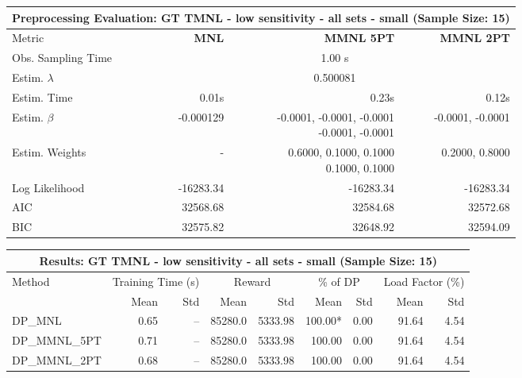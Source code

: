 
\begin{samepage}
\begin{center}
  \small
  \begin{tabular}{l|r|r|r}
    \toprule
    \multicolumn{4}{c}{\textbf{Preprocessing Evaluation: GT TMNL - low sensitivity - all sets - small (Sample Size: 15)}} \\
    \midrule
    Metric & \textbf{MNL} & \textbf{MMNL 5PT} & \textbf{MMNL 2PT} \\
    \midrule
    Obs. Sampling Time & \multicolumn{3}{c}{1.00 s} \\
    Estim. $\lambda$ & \multicolumn{3}{c}{0.500081} \\
    Estim. Time & 0.01s & 0.23s & 0.12s \\
    Estim. $\beta$ & -0.000129 & \makecell[tr]{-0.0001, -0.0001, -0.0001 \\ -0.0001, -0.0001} & -0.0001, -0.0001 \\
    Estim. Weights & - & \makecell[tr]{0.6000, 0.1000, 0.1000 \\ 0.1000, 0.1000} & 0.2000, 0.8000 \\
    Log Likelihood & -16283.34 & -16283.34 & -16283.34 \\
    AIC & 32568.68 & 32584.68 & 32572.68 \\
    BIC & 32575.82 & 32648.92 & 32594.09 \\
    \bottomrule
  \end{tabular}
\end{center}
\begin{center}
  \small
  \begin{tabular}{l|rr|rr|rr|rr}
    \toprule
    \multicolumn{9}{c}{\textbf{Results: GT TMNL - low sensitivity - all sets - small (Sample Size: 15)}} \\
    \midrule
    Method & \multicolumn{2}{c|}{Training Time (s)} & \multicolumn{2}{c|}{Reward} & \multicolumn{2}{c|}{\% of DP} & \multicolumn{2}{c}{Load Factor (\%)} \\
    & Mean & Std & Mean & Std & Mean & Std & Mean & Std \\
    \midrule
    DP\_MNL      &     0.65 &    -- &    85280.0 &    5333.98 & 100.00* &    0.00 &   91.64 &    4.54 \\
    DP\_MMNL\_5PT &     0.71 &    -- &    85280.0 &    5333.98 &  100.00 &    0.00 &   91.64 &    4.54 \\
    DP\_MMNL\_2PT &     0.68 &    -- &    85280.0 &    5333.98 &  100.00 &    0.00 &   91.64 &    4.54 \\
    \midrule

\end{tabular}
\end{center}
\end{samepage}
